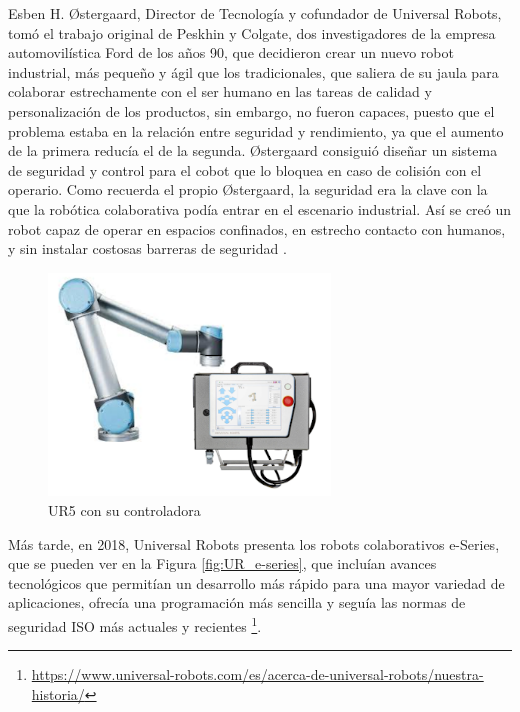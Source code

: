 Esben H. Østergaard, Director de Tecnología y cofundador de Universal Robots, tomó el trabajo original de Peskhin y Colgate, dos investigadores de la empresa automovilística Ford de los años 90, que decidieron crear un nuevo robot industrial, más pequeño y ágil que los tradicionales, que saliera de su jaula para colaborar estrechamente con el ser humano en las tareas de calidad y personalización de los productos, sin embargo, no fueron capaces, puesto que el problema estaba en la relación entre seguridad y rendimiento, ya que el aumento de la primera reducía el de la segunda. Østergaard consiguió diseñar un sistema de seguridad y control para el cobot que lo bloquea en caso de colisión con el operario. Como recuerda el propio Østergaard, la seguridad era la clave con la que la robótica colaborativa podía entrar en el escenario industrial. Así se creó un robot capaz de operar en espacios confinados, en estrecho contacto con humanos, y sin instalar costosas barreras de seguridad \cite{Cusano22}.
  
  \begin{figure} [h!]
    \begin{center}
      \includegraphics[width=75mm]{figs/UR5_controller.png}
    \end{center}
    \caption{UR5 con su controladora}
    \label{fig:UR5}
  \end{figure}
  
  \pagebreak
  
Más tarde, en 2018, Universal Robots presenta los robots colaborativos e-Series, que se pueden ver en la Figura \ref{fig:UR_e-series}, que incluían avances tecnológicos que permitían un desarrollo más rápido para una mayor variedad de aplicaciones, ofrecía una programación más sencilla y seguía las normas de seguridad ISO más actuales y recientes \footnote{\url{https://www.universal-robots.com/es/acerca-de-universal-robots/nuestra-historia/}}.
 
